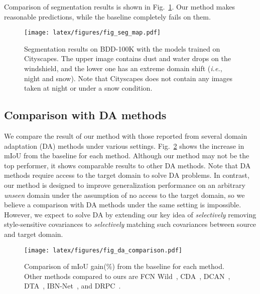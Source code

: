 \documentclass[final]{latex/cvpr}
\begin{document}
Comparison of segmentation results is shown in Fig.~\ref{fig:seg_map}. Our method makes reasonable predictions, while the baseline completely fails on them.


\begin{figure}[h!]
\vspace*{-0.15cm}
  \centering\texttt{[image: latex/figures/fig\_seg\_map.pdf]}
  \vspace*{-0.2cm}
  \caption{Segmentation results on BDD-100K with the models trained on Cityscapes. The upper image contains dust and water drops on the windshield, and the lower one has an extreme domain shift (\textit{i.e.}, night and snow). Note that Cityscapes does not contain any images taken at night or under a snow condition.
  }
\label{fig:seg_map}
\vspace*{-0.3cm}
\end{figure}

\vspace{-0.0cm}
\subsection{Comparison with DA methods}
\vspace{-0.05cm}
We compare the result of our method with those reported from several domain adaptation (DA) methods under various settings. Fig.~\ref{fig:da_comparison} shows the increase in mIoU from the baseline for each method. Although our method may not be the top performer, it shows comparable results to other DA methods. Note that DA methods require access to the target domain to solve DA problems. In contrast, our method is designed to improve generalization performance on an arbitrary \emph{unseen} domain under the assumption of no access to the target domain, so we believe a comparison with DA methods under the same setting is impossible. However, we expect to solve DA by extending our key idea of \emph{selectively} removing style-sensitive covariances to \emph{selectively} matching such covariances between source and target domain.


\begin{figure}[h]
\centering
\begin{center}
  \texttt{[image: latex/figures/fig\_da\_comparison.pdf]}
\end{center}
\vspace*{-0.3cm}
   \caption{Comparison of mIoU gain($\%$) from the baseline for each method. Other methods compared to ours are FCN Wild~\cite{hoffman2016fcns}, CDA~\cite{zhang2017curriculum}, DCAN~\cite{wu2018dcan}, DTA~\cite{lee2019drop}, IBN-Net~\cite{pan2018two}, and DRPC~\cite{zhao2017pyramid}.}
\label{fig:da_comparison}
\vspace*{-0.2cm}
\end{figure}
\end{document}
